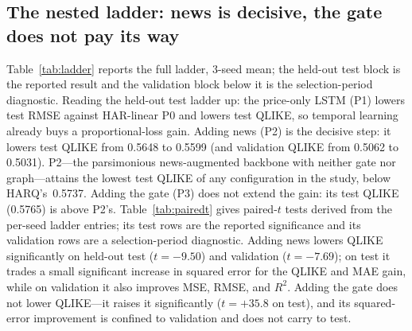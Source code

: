 \documentclass[runningheads]{llncs}
\newcommand{\PoneTestQ}{0.5648}  %
\newcommand{\PtwoTestQ}{0.5599}  %
\newcommand{\PthreeTestQ}{0.5765}%
\newcommand{\PoneValQ}{0.5062}   %
\newcommand{\PtwoValQ}{0.5031}   %
\newcommand{\HARQtestQ}{0.5737}  %
\newcommand{\newsValT}{-7.69}
\newcommand{\newsTestT}{-9.50}
\newcommand{\gateTestT}{+35.8}
\newcommand{\nseed}{3}
\begin{document}
\subsection{The nested ladder: news is decisive, the gate does not pay its way}
\label{sec:ladder}
Table~\ref{tab:ladder} reports the full ladder, \nseed-seed mean; the held-out test block is the
reported result and the validation block below it is the selection-period diagnostic. Reading the
held-out test ladder up: the price-only LSTM (P1) lowers test RMSE against HAR-linear P0 and lowers test
QLIKE, so temporal learning already buys a proportional-loss gain. Adding news (P2) is the decisive step:
it lowers test QLIKE from \PoneTestQ{} to \PtwoTestQ{} (and validation QLIKE from \PoneValQ{} to
\PtwoValQ). P2---the parsimonious news-augmented backbone with neither gate nor graph---attains the lowest
test QLIKE of any configuration in the study, below HARQ's~\HARQtestQ. Adding the gate (P3) does not
extend the gain: its test QLIKE (\PthreeTestQ) is above P2's. Table~\ref{tab:pairedt} gives paired-$t$
tests derived from the per-seed ladder entries; its test rows are the reported significance and its
validation rows are a selection-period diagnostic. Adding news lowers QLIKE significantly on held-out test
($t=\newsTestT$) and validation ($t=\newsValT$); on test it trades a small significant increase in
squared error for the QLIKE and MAE gain, while on validation it also improves MSE, RMSE, and $R^2$.
Adding the gate does not lower QLIKE---it raises it significantly ($t=\gateTestT$ on test), and its
squared-error improvement is confined to validation and does not carry to test.
\end{document}
